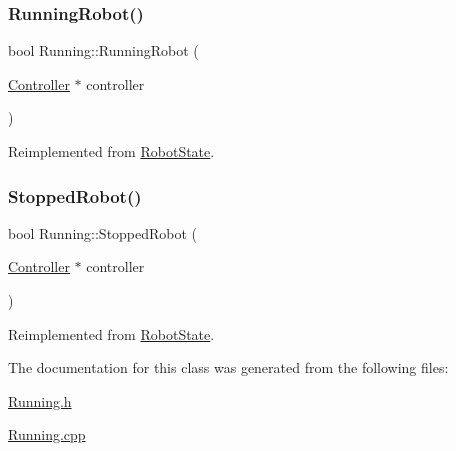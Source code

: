 \subsubsection{\texorpdfstring{RunningRobot()}{RunningRobot()}}
{\footnotesize\ttfamily bool Running\+::\+Running\+Robot (\begin{DoxyParamCaption}\item[{\mbox{\hyperlink{class_controller}{Controller}} $\ast$}]{controller }\end{DoxyParamCaption})\hspace{0.3cm}{\ttfamily [virtual]}}



Reimplemented from \mbox{\hyperlink{class_robot_state_a34151e935ca2807b89df8ab7f0561487}{Robot\+State}}.

\mbox{\label{class_running_aac21e16784554ee4ac95b9a76310ed42}} 
\subsubsection{\texorpdfstring{StoppedRobot()}{StoppedRobot()}}
{\footnotesize\ttfamily bool Running\+::\+Stopped\+Robot (\begin{DoxyParamCaption}\item[{\mbox{\hyperlink{class_controller}{Controller}} $\ast$}]{controller }\end{DoxyParamCaption})\hspace{0.3cm}{\ttfamily [virtual]}}



Reimplemented from \mbox{\hyperlink{class_robot_state_a58fdf53d3f27201879d4dbf7aaef7ca1}{Robot\+State}}.



The documentation for this class was generated from the following files\+:\begin{DoxyCompactItemize}
\item 
\mbox{\hyperlink{_running_8h}{Running.\+h}}\item 
\mbox{\hyperlink{_running_8cpp}{Running.\+cpp}}\end{DoxyCompactItemize}
